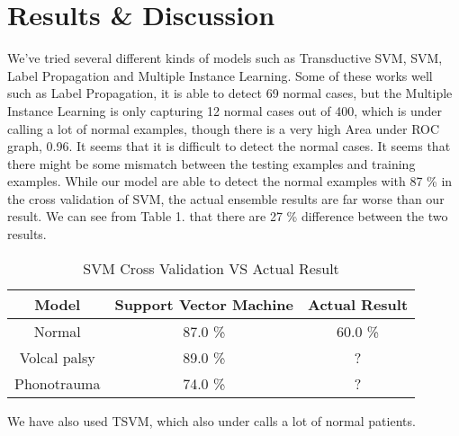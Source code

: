 \section{Results \& Discussion}

We've tried several different kinds of models such as Transductive SVM, SVM, Label Propagation and Multiple Instance Learning. Some of these works well such as Label Propagation, it is able to detect 69 normal cases, but the Multiple Instance Learning is only capturing 12 normal cases out of 400, which is under calling a lot of normal examples, though there is a very high Area under ROC graph, 0.96. It seems that it is difficult to detect the normal cases. It seems that there might be some mismatch between the testing examples and training examples. While our model are able to detect the normal examples with 87 \% in the cross validation of SVM, the actual ensemble results are far worse than our result. We can see from Table 1. that there are 27 \% difference between the two results.


\begin{table}[htbp]
	\caption{SVM Cross Validation VS Actual Result}
	\begin{center}
		\begin{tabular}{|c|c|c|}
			\hline
			Model & Support Vector Machine & Actual Result \\
			\hline
			Normal & 87.0 \% & 60.0 \% \\
			\hline
			Volcal palsy & 89.0 \% & ?\\
			\hline
			Phonotrauma & 74.0 \% & ?\\
			\hline
		\end{tabular}
		\label{tab2}
	\end{center}
\end{table}


We have also used TSVM, which also under calls a lot of normal patients.
